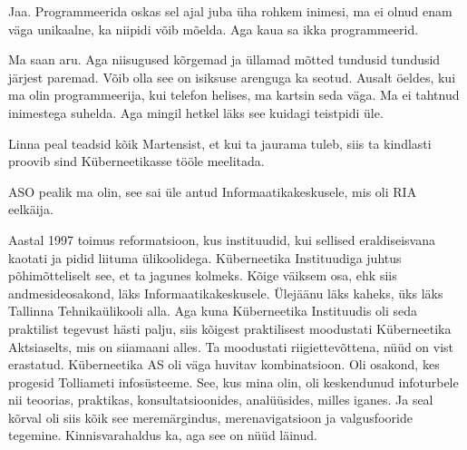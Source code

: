 
Jaa. Programmeerida oskas sel ajal juba üha rohkem inimesi, ma ei olnud enam 
väga unikaalne, ka niipidi võib mõelda. Aga kaua sa ikka programmeerid.


Ma saan aru. Aga niisugused kõrgemad ja üllamad mõtted tundusid tundusid 
järjest paremad. Võib olla see on isiksuse arenguga ka seotud. Ausalt öeldes,  
kui ma olin programmeerija, kui telefon helises, ma kartsin seda väga. Ma ei 
tahtnud inimestega suhelda. Aga mingil hetkel läks see kuidagi  teistpidi üle.

Linna peal teadsid kõik  Martensist, et  kui ta jaurama tuleb, siis ta 
kindlasti proovib sind  Küberneetikasse tööle meelitada. 


ASO pealik ma olin, see sai üle antud 
Informaatikakeskusele, mis oli RIA 
eelkäija. 

Aastal 1997 toimus reformatsioon, kus instituudid, kui sellised eraldiseisvana 
kaotati ja  pidid liituma ülikoolidega. Küberneetika Instituudiga juhtus 
põhimõtteliselt see, et ta jagunes kolmeks. Kõige väiksem osa, ehk siis 
andmesideosakond,  läks Informaatikakeskusele. Ülejäänu läks kaheks, üks läks 
Tallinna Tehnikaülikooli alla. Aga kuna Küberneetika Instituudis oli seda 
praktilist tegevust hästi palju, siis kõigest praktilisest moodustati 
Küberneetika Aktsiaselts, mis on siiamaani alles. Ta 
moodustati riigiettevõttena, nüüd on  vist erastatud. Küberneetika AS  oli väga 
huvitav  kombinatsioon. Oli osakond, kes progesid  Tolliameti 
infosüsteeme. See, kus mina olin, oli keskendunud infoturbele  nii teoorias, 
praktikas, konsultatsioonides, analüüsides, milles iganes. Ja seal kõrval oli 
siis kõik see meremärgindus,  merenavigatsioon ja valgusfooride tegemine. 
Kinnisvarahaldus ka, aga see on nüüd läinud. 
 

